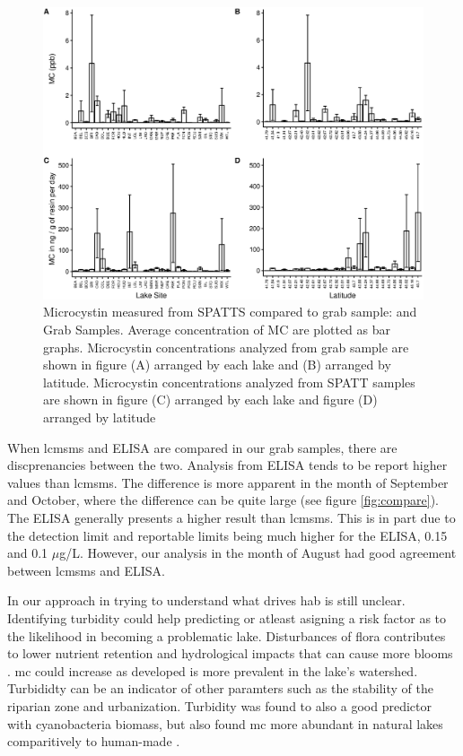 \begin{figure}[!hp]
\includegraphics[width=\textwidth]{figures/spatttboxplotlake}
\caption{
Microcystin measured from SPATTS compared to grab sample: and Grab Samples. Average concentration of MC are plotted as bar graphs. Microcystin concentrations analyzed from grab sample are shown in figure (A) arranged by each lake and (B) arranged by latitude. Microcystin concentrations analyzed from SPATT samples are shown in figure (C) arranged by each lake and figure (D) arranged by latitude
}
\label{fig:spattbox}
\end{figure}




When \gls{lcmsms} and ELISA are compared in our grab samples, there are discprenancies between the two. Analysis from ELISA tends to be report higher values than \gls{lcmsms}. The difference is more apparent in the month of September and October, where the difference can be quite large (see figure \ref{fig:compare}). The ELISA generally presents a higher result than \gls{lcmsms}. This is in part due to the detection limit and reportable limits being much higher for the ELISA, 0.15 and 0.1 $\mu$g/L. However, our analysis in the month of August had good agreement between \gls{lcmsms} and ELISA.  



In our approach in trying to understand what drives \gls{hab} is still unclear. Identifying turbidity could help predicting or atleast asigning a risk factor as to the likelihood in becoming a problematic lake. Disturbances of flora contributes to lower nutrient retention and hydrological impacts that can cause more blooms \cite{anderson_harmful_2002, codd_cyanobacterial_2000, fraterrigo_influence_2008}.
\gls{mc} could increase as developed is more prevalent in the lake's watershed.
Turbididty can be an indicator of other paramters such as the stability of the riparian zone and urbanization. Turbidity was found to also a good predictor with cyanobacteria biomass, but also found \gls{mc} more abundant in natural lakes comparitively to human-made \cite{taranu_predicting_2017}.  

